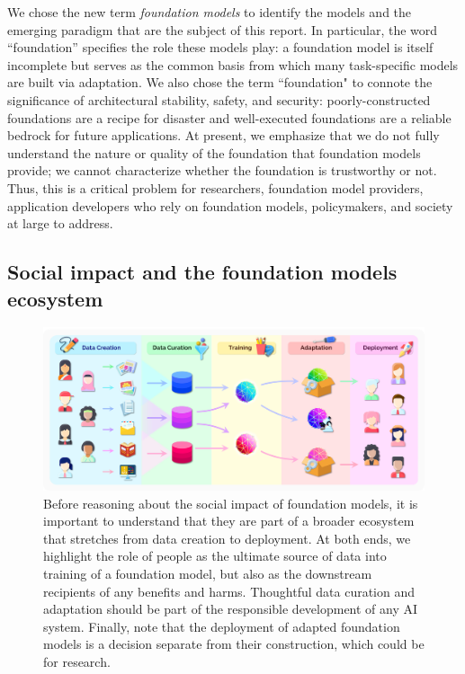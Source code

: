 We chose the new term \emph{foundation models} to identify the models and the emerging paradigm that are the subject of this report.
In particular, the word ``foundation'' specifies the role these models play:
a foundation model is itself incomplete but serves as the common basis from which many task-specific models are built via adaptation.
We also chose the term ``foundation" to connote the significance of architectural stability, safety, and security:
poorly-constructed foundations are a recipe for disaster and well-executed foundations are a reliable bedrock for future applications.
At present, we emphasize that we do not fully understand the nature or quality of the foundation that foundation models provide; we cannot characterize whether the foundation is trustworthy or not.
Thus, this is a critical problem for researchers, foundation model providers, application developers who rely on foundation models, policymakers, and society at large to address.

\subsection{Social impact and the foundation models ecosystem}
\label{sec:ecosystem}

\begin{figure}[t]
\centering
\includegraphics[width=\linewidth]{figures/Intro_Ecosystem.png}
\caption{
\label{fig:ecosystem}
Before reasoning about the social impact of foundation models,
it is important to understand that they are part of a broader ecosystem
that stretches from data creation to deployment.
At both ends, we highlight the role of people as the ultimate source of data into training of a foundation model,
but also as the downstream recipients of any benefits and harms.
Thoughtful data curation and adaptation should be part of the responsible development of any AI system.
Finally, note that the deployment of adapted foundation models is a decision separate from their construction,
which could be for research.
}
\end{figure}

